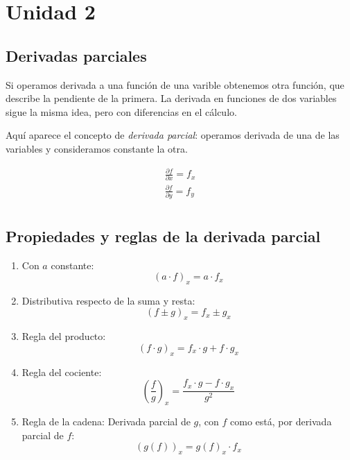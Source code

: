 \section{Unidad 2}

\subsection{Derivadas parciales}

Si operamos derivada a una función de una varible obtenemos otra función,
que describe la pendiente de la primera.
La derivada en funciones de dos variables sigue la misma idea, 
pero con diferencias en el cálculo.

Aquí aparece el concepto de \textit{derivada parcial}: 
operamos derivada de una de las variables y consideramos constante la otra.

\begin{align*}
\frac{\partial f}{\partial x} = f_x \\
\frac{\partial f}{\partial y} = f_y \\
\end{align*}

\subsection{Propiedades y reglas de la derivada parcial}

\begin{enumerate}
    \item Con \(a\) constante: 
    \begin{equation*}
        (a \cdot f)_x = a\cdot f_x
    \end{equation*}
    \item Distributiva respecto de la suma y resta: 
    \begin{equation*}
        (f \pm g)_x = f_x \pm g_x
    \end{equation*}
    \item Regla del producto: 
    \begin{equation*}
        (f\cdot g)_x = f_x\cdot g + f\cdot g_x
    \end{equation*}
    \item Regla del cociente: 
    \begin{equation*}
        \left(\frac{f}{g}\right)_x = \frac{f_x\cdot g - f\cdot g_x}{g^{2}}
    \end{equation*}
    \item Regla de la cadena: 
    Derivada parcial de \(g\), con \(f\) como está,
    por derivada parcial de \(f\):
    \begin{equation*}
        (g(f))_x = g(f)_x \cdot f_x
    \end{equation*}
\end{enumerate}

